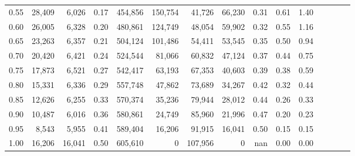 \begin{tabular}{rrrcrrrrrrrrrrr}
0.55 &  28,409 &   6,026 &                                       0.17 &  454,856 &  150,754 &   41,726 &   66,230 &  0.31 &  0.61 &                         1.40 \\
0.60 &  26,005 &   6,328 &                                       0.20 &  480,861 &  124,749 &   48,054 &   59,902 &  0.32 &  0.55 &                         1.16 \\
0.65 &  23,263 &   6,357 &                                       0.21 &  504,124 &  101,486 &   54,411 &   53,545 &  0.35 &  0.50 &                         0.94 \\
0.70 &  20,420 &   6,421 &                                       0.24 &  524,544 &   81,066 &   60,832 &   47,124 &  0.37 &  0.44 &                         0.75 \\
0.75 &  17,873 &   6,521 &                                       0.27 &  542,417 &   63,193 &   67,353 &   40,603 &  0.39 &  0.38 &                         0.59 \\
0.80 &  15,331 &   6,336 &                                       0.29 &  557,748 &   47,862 &   73,689 &   34,267 &  0.42 &  0.32 &                         0.44 \\
0.85 &  12,626 &   6,255 &                                       0.33 &  570,374 &   35,236 &   79,944 &   28,012 &  0.44 &  0.26 &                         0.33 \\
0.90 &  10,487 &   6,016 &                                       0.36 &  580,861 &   24,749 &   85,960 &   21,996 &  0.47 &  0.20 &                         0.23 \\
0.95 &   8,543 &   5,955 &                                       0.41 &  589,404 &   16,206 &   91,915 &   16,041 &  0.50 &  0.15 &                         0.15 \\
1.00 &  16,206 &  16,041 &                                       0.50 &  605,610 &        0 &  107,956 &        0 &   nan &  0.00 &                         0.00 \\
\bottomrule
\end{tabular}
